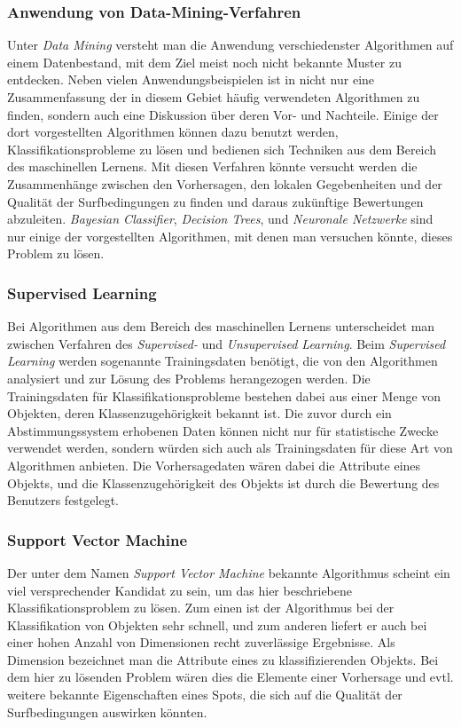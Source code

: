 \subsubsection{Anwendung von Data-Mining-Verfahren}
Unter \textit{Data Mining} versteht man die Anwendung verschiedenster
Algorithmen auf einem Datenbestand, mit dem Ziel meist noch nicht
bekannte Muster zu entdecken. Neben vielen Anwendungsbeispielen ist in
\cite{Seagaran2007} nicht nur eine Zusammenfassung der in diesem
Gebiet häufig verwendeten Algorithmen zu finden, sondern auch eine
Diskussion über deren Vor- und Nachteile. Einige der dort
vorgestellten Algorithmen können dazu benutzt werden,
Klassifikationsprobleme zu lösen und bedienen sich Techniken aus dem
Bereich des maschinellen Lernens. Mit diesen Verfahren könnte versucht
werden die Zusammenhänge zwischen den Vorhersagen, den lokalen
Gegebenheiten und der Qualität der Surfbedingungen zu finden und
daraus zukünftige Bewertungen abzuleiten. \textit{Bayesian
  Classifier}, \textit{Decision Trees}, und \textit{Neuronale
  Netzwerke} sind nur einige der vorgestellten Algorithmen, mit denen
man versuchen könnte, dieses Problem zu lösen.

\subsubsection{Supervised Learning}
Bei Algorithmen aus dem Bereich des maschinellen Lernens unterscheidet
man zwischen Verfahren des \textit{Supervised-} und
\textit{Unsupervised Learning}. Beim \textit{Supervised Learning}
werden sogenannte Trainingsdaten benötigt, die von den Algorithmen
analysiert und zur Lösung des Problems herangezogen werden. Die
Trainingsdaten für Klassifikationsprobleme bestehen dabei aus einer
Menge von Objekten, deren Klassenzugehörigkeit bekannt ist. Die zuvor
durch ein Abstimmungssystem erhobenen Daten können nicht nur für
statistische Zwecke verwendet werden, sondern würden sich auch als
Trainingsdaten für diese Art von Algorithmen anbieten. Die
Vorhersagedaten wären dabei die Attribute eines Objekts, und die
Klassenzugehörigkeit des Objekts ist durch die Bewertung des Benutzers
festgelegt.

\subsubsection{Support Vector Machine}
Der unter dem Namen \textit{Support Vector Machine} bekannte
Algorithmus scheint ein viel versprechender Kandidat zu sein, um das
hier beschriebene Klassifikationsproblem zu lösen. Zum einen ist der
Algorithmus bei der Klassifikation von Objekten sehr schnell, und zum
anderen liefert er auch bei einer hohen Anzahl von Dimensionen recht
zuverlässige Ergebnisse. Als Dimension bezeichnet man die Attribute
eines zu klassifizierenden Objekts. Bei dem hier zu lösenden Problem
wären dies die Elemente einer Vorhersage und evtl. weitere bekannte
Eigenschaften eines Spots, die sich auf die Qualität der
Surfbedingungen auswirken könnten.

